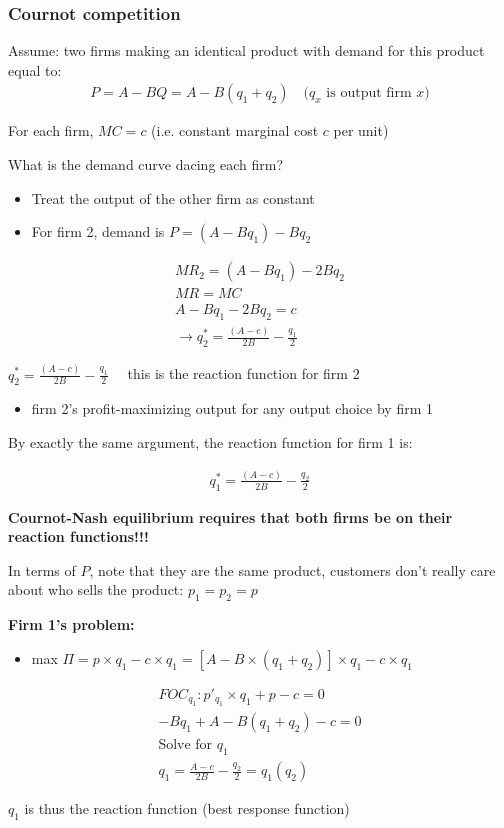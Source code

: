 \documentclass[10pt]{article}
\begin{document}
\subsubsection{Cournot competition}

Assume: two firms making an identical product with demand for this product equal to:
\begin{align*}
    P = A - BQ = A - B(q_1 + q_2) \quad\text{($q_x$ is output firm $x$)}
\end{align*}

For each firm, $MC = c$ (i.e. constant marginal cost $c$ per unit)

\hfill 

What is the demand curve dacing each firm?
\begin{itemize}
    \item Treat the output of the other firm as constant
    \item For firm 2, demand is $P = (A - Bq_1) - Bq_2$
\end{itemize}

\begin{align*}
    MR_2 = (A - Bq_1) - 2Bq_2\\
    MR = MC \\
    A - Bq_1 - 2Bq_2 = c \\
    \to q^*_2 = \frac{(A - c)}{2B} - \frac{q_1}{2}
\end{align*}

\newpage

$q^*_2 = \frac{(A - c)}{2B} - \frac{q_1}{2} \quad$ this is the reaction function for firm 2
\begin{itemize}
    \item firm 2's profit-maximizing output for any output choice by firm 1
\end{itemize}

\hfill 

By exactly the same argument, the reaction function for firm 1 is: 

\begin{align*}
    q^*_1 = \frac{(A - c)}{2B} - \frac{q_2}{2}
\end{align*}

\textbf{Cournot-Nash equilibrium requires that both firms be on their reaction functions!!!}

In terms of $P$, note that they are the same product, customers don't really care about who sells the product: $p_1 = p_2 = p$ 

\hfill 

\textbf{Firm 1's problem: }
\begin{itemize}
    \item max $\Pi = p \times q_1 - c \times q_1 = [A - B \times (q_1 + q_2)] \times q_1 - c \times q_1$
\end{itemize}

\begin{align*}
    FOC_{q_1}: p'_{q_1} \times q_1 + p - c = 0 \\
    -Bq_1 + A - B(q_1 + q_2) - c = 0 \\
    \text{Solve for } q_1 \\
    q_1 = \frac{A - c}{2B} - \frac{q_2}{2} = q_1(q_2)
\end{align*}

$q_1$ is thus the reaction function (best response function)
\end{document}
